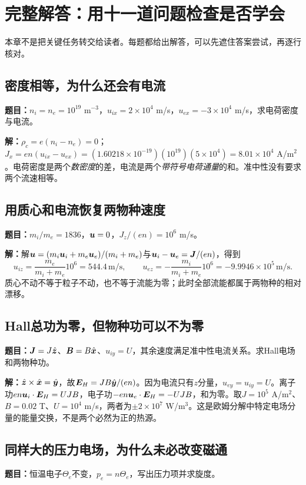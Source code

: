 \chapter{完整解答：用十一道问题检查是否学会}
\label{hall:solutions}
本章不是把关键任务转交给读者。每题都给出解答，可以先遮住答案尝试，再逐行核对。

\section{密度相等，为什么还会有电流}
\textbf{题目：}$n_i=n_e=10^{19}$ m$^{-3}$，$u_{ix}=2\times10^4$ m/s，$u_{ex}=-3\times10^4$ m/s，求电荷密度与电流。

\textbf{解：}$\rho_c=e(n_i-n_e)=0$；$J_x=en(u_{ix}-u_{ex})=(1.60218\times10^{-19})(10^{19})(5\times10^4)=8.01\times10^4$ A/m$^2$。电荷密度是两个\emph{数密度}的差，电流是两个\emph{带符号电荷通量}的和。准中性没有要求两个流速相等。

\section{用质心和电流恢复两物种速度}
\textbf{题目：}$m_i/m_e=1836$，$\bm{u}=0$，$J_z/(en)=10^6$ m/s。

\textbf{解：}解$\bm{u}=(m_i\bm{u}_i+m_e\bm{u}_e)/(m_i+m_e)$与$\bm{u}_i-\bm{u}_e=\bm{J}/(en)$，得到
\begin{equation}
u_{iz}=\frac{m_e}{m_i+m_e}10^6=544.4\,\mathrm{m/s},\qquad
u_{ez}=-\frac{m_i}{m_i+m_e}10^6=-9.9946\times10^5\,\mathrm{m/s}.
\end{equation}
质心不动不等于粒子不动，也不等于流能为零；此时全部流能都属于两物种的相对漂移。

\section{Hall总功为零，但物种功可以不为零}
\textbf{题目：}$\bm{J}=J\hat{\bm{z}}$、$\bm{B}=B\hat{\bm{x}}$、$u_{iy}=U$，其余速度满足准中性电流关系。求Hall电场和两物种功。

\textbf{解：}$\hat{\bm{z}}\times\hat{\bm{x}}=\hat{\bm{y}}$，故$\bm{E}_H=JB\hat{\bm{y}}/(en)$。因为电流只有$z$分量，$u_{ey}=u_{iy}=U$。离子功$en\bm{u}_i\cdot\bm{E}_H=UJB$，电子功$-en\bm{u}_e\cdot\bm{E}_H=-UJB$，和为零。取$J=10^5$ A/m$^2$、$B=0.02$ T、$U=10^4$ m/s，两者为$\pm2\times10^7$ W/m$^3$。这是欧姆分解中特定电场分量的能量交换，不是两个必然为正的热源。

\section{同样大的压力电场，为什么未必改变磁通}
\textbf{题目：}恒温电子$\Theta_e$不变，$p_e=n\Theta_e$，写出压力项并求旋度。

